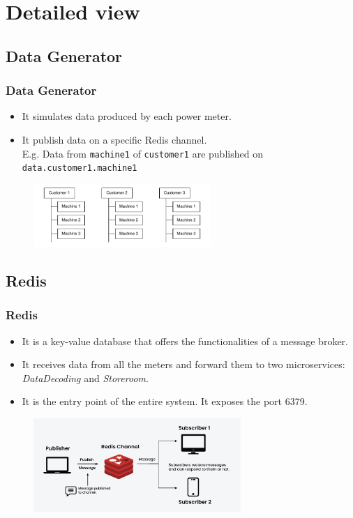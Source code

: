 \section{Detailed view}

\subsection{Data Generator}
\begin{frame}
	\frametitle{Data Generator}
	
	\begin{itemize}
		\item It simulates data produced by each power meter.
		\item It publish data on a specific Redis channel.\\
		E.g. Data from \texttt{machine1} of \texttt{customer1} are published on \texttt{data.customer1.machine1}
	\end{itemize}
	
	\bigskip
	\begin{figure}[h]
		\centering
		\includegraphics[width=0.6\textwidth]{./drawings/MachinesHierarchy.pdf}
	\end{figure}
\end{frame}


\subsection{Redis}
\begin{frame}
	\frametitle{Redis}
	
	\begin{itemize}
		\item It is a key-value database that offers the functionalities of a message broker.
		\item It receives data from all the meters and forward them to two microservices: \emph{DataDecoding} and \emph{Storeroom}.
		\item It is the entry point of the entire system. It exposes the port 6379.
	\end{itemize}
	
	\begin{figure}[h]
		\centering
		\includegraphics[width=0.7\textwidth]{./img/redis-publish-subscriber.png}
	\end{figure}
\end{frame}

